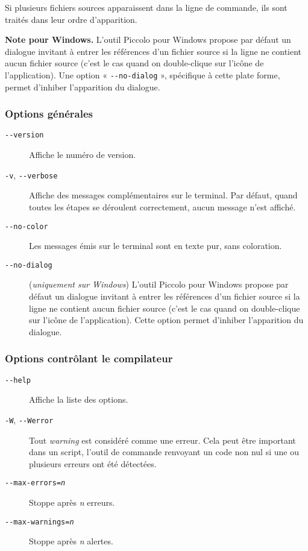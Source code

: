 Si plusieurs fichiers sources apparaissent dans la ligne de commande, ils sont traités dans leur ordre d’apparition.

{\bf Note pour Windows.} L’outil Piccolo pour Windows propose par défaut un dialogue invitant à entrer les références d’un fichier source si la ligne ne contient aucun fichier source (c’est le cas quand on double-clique sur l’icône de l’application). Une option « \texttt{-{-}no-dialog} », spécifique à cette plate forme, permet d'inhiber l’apparition du dialogue.

\subsubsection{Options générales}

\begin{description}
  \item[\texttt{-{-}version}] Affiche le numéro de version.

  \item[\texttt{-v}, \texttt{-{-}verbose}] Affiche des messages complémentaires sur le terminal. Par défaut, quand toutes les étapes se déroulent correctement, aucun message n’est affiché.

  \item[\texttt{-{-}no-color}] Les messages émis sur le terminal sont en texte pur, sans coloration.

  \item[\texttt{-{-}no-dialog}] (\emph{uniquement sur Windows}) L’outil Piccolo pour Windows propose par défaut un dialogue invitant à entrer les références d’un fichier source si la ligne ne contient aucun fichier source (c’est le cas quand on double-clique sur l’icône de l’application). Cette option permet d'inhiber l’apparition du dialogue.
\end{description}



\subsubsection{Options contrôlant le compilateur}




\begin{description}
  \item[\texttt{-{-}help}] Affiche la liste des options.

  \item[\texttt{-W}, \texttt{-{-}Werror}] Tout \emph{warning} est considéré comme une erreur. Cela peut être important dans un script, l’outil de commande renvoyant un code non nul si une ou plusieurs erreurs ont été détectées.

  \item[\texttt{-{-}max-errors=\emph{n}}] Stoppe après \emph{n} erreurs.

  \item[\texttt{-{-}max-warnings=\emph{n}}] Stoppe après \emph{n} alertes.

\end{description}




